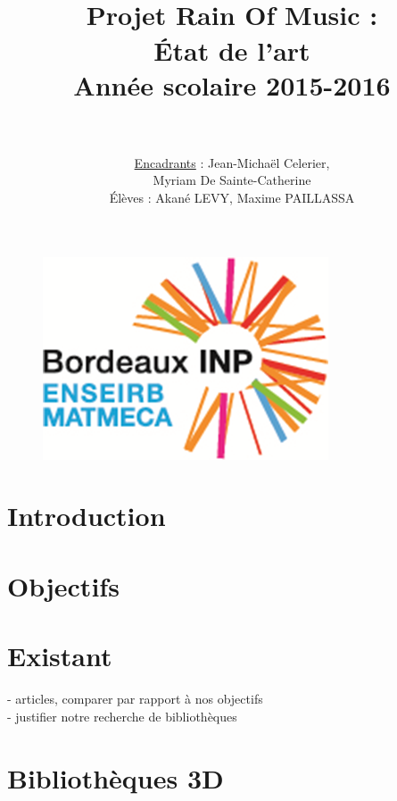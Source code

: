 \documentclass[paper=a4,12pt]{article}
\title{
  \horrule{1.5pt} \\[0.5cm]	
  \Huge \textbf{Projet Rain Of Music : \\ État de l'art} \\ [20pt]
    \LARGE Année scolaire 2015-2016 \\ 
  \horrule{1.5pt} \\[0.5cm]
}
\author{						
    \LARGE \underline{Encadrants} : Jean-Michaël Celerier, \\
   					\LARGE	\hspace{5cm} Myriam De Sainte-Catherine\\			
   	\vspace{1cm} 
   	\normalfont
   	\LARGE Élèves :  Akané LEVY, Maxime PAILLASSA    
}
\date{}
\numberwithin{equation}{section}		%
\numberwithin{figure}{section}			%
\numberwithin{table}{section}				%
\begin{document}
\graphicspath{{./imgs/}{.}}
\maketitle

\begin{figure}[H]
  \centering\includegraphics[scale=1.2]{logo_enseirb.png}
\end{figure}

\newpage

\tableofcontents

\newpage
\normalsize

\section{Introduction}


\section{Objectifs}



\section{Existant}





- articles, comparer par rapport à nos objectifs \\

- justifier notre recherche de bibliothèques



\section{Bibliothèques 3D}


%
\end{document}

